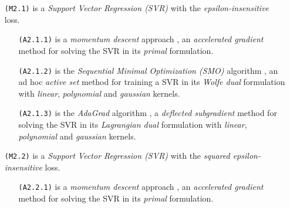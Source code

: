 \begin{itemize}
\item[\texttt{(M2.1)}] is a \emph{Support Vector Regression (SVR)} with the \emph{epsilon-insensitive} loss.

\begin{itemize}
\item[\texttt{(A2.1.1)}] is a \emph{momentum descent} approach \cite{polyak1964some, nesterov1998introductory}, an \emph{accelerated gradient} method for solving the SVR in its \emph{primal} formulation.

\item[\texttt{(A2.1.2)}] is the \emph{Sequential Minimal Optimization (SMO)} algorithm \cite{flake2002efficient, shevade1999improvements}, an ad hoc \emph{active set} method for training a SVR in its \emph{Wolfe dual} formulation with \emph{linear}, \emph{polynomial} and \emph{gaussian} kernels.

\item[\texttt{(A2.1.3)}] is the \emph{AdaGrad} algorithm \cite{duchi2011adaptive}, a \emph{deflected subgradient} method for solving the SVR in its \emph{Lagrangian dual} formulation with \emph{linear}, \emph{polynomial} and \emph{gaussian} kernels.
\end{itemize}

\end{itemize}

\begin{itemize}
\item[\texttt{(M2.2)}] is a \emph{Support Vector Regression (SVR)} with the \emph{squared epsilon-insensitive} loss.

\begin{itemize}
\item[\texttt{(A2.2.1)}] is a \emph{momentum descent} approach \cite{polyak1964some, nesterov1998introductory}, an \emph{accelerated gradient} method for solving the SVR in its \emph{primal} formulation.
\end{itemize}

\end{itemize}